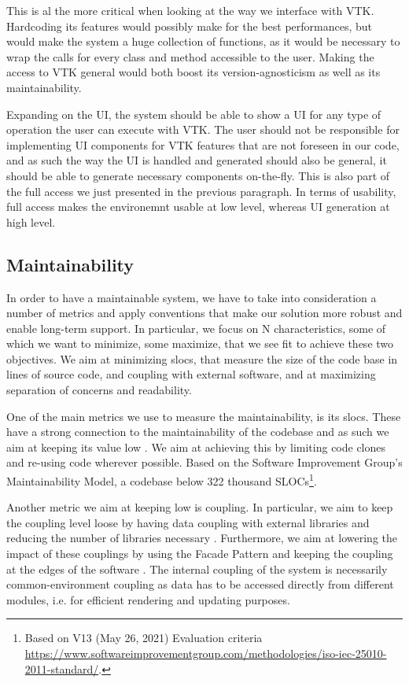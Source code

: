 This is al the more critical when looking at the way we interface with VTK. Hardcoding its features would possibly make for the best performances, but would make the system a huge collection of functions, as it would be necessary to wrap the calls for every class and method accessible to the user. Making the access to VTK general would both boost its version-agnosticism as well as its maintainability.

Expanding on the UI, the system should be able to show a UI for any type of operation the user can execute with VTK. The user should not be responsible for implementing UI components for VTK features that are not foreseen in our code, and as such the way the UI is handled and generated should also be general, it should be able to generate necessary components on-the-fly. This is also part of the full access we just presented in the previous paragraph. In terms of usability, full access makes the environemnt usable at low level, whereas UI generation at high level.

\subsection{Maintainability}

In order to have a maintainable system, we have to take into consideration a number of metrics and apply conventions that make our solution more robust and enable long-term support. In particular, we focus on N characteristics, some of which we want to minimize, some maximize, that we see fit to achieve these two objectives. We aim at minimizing \acrfull{slocs}, that measure the size of the code base in lines of source code, and coupling with external software, and at maximizing separation of concerns and readability.

One of the main metrics we use to measure the maintainability, is its \acrlong{slocs}. These have a strong connection to the maintainability of the codebase and as such we aim at keeping its value low \cite{4335232}. We aim at achieving this by limiting code clones and re-using code wherever possible. Based on the Software Improvement Group's Maintainability Model, a codebase below 322 thousand SLOCs\footnote{Based on V13 (May 26, 2021) Evaluation criteria \url{https://www.softwareimprovementgroup.com/methodologies/iso-iec-25010-2011-standard/}.}.

Another metric we aim at keeping low is coupling. In particular, we aim to keep the coupling level loose by having data coupling with external libraries and reducing the number of libraries necessary \cite{8016712}. Furthermore, we aim at lowering the impact of these couplings by using the Facade Pattern and keeping the coupling at the edges of the software \cite{alma990009471180205131}. The internal coupling of the system is necessarily common-environment coupling as data has to be accessed directly from different modules, i.e. for efficient rendering and updating purposes.

